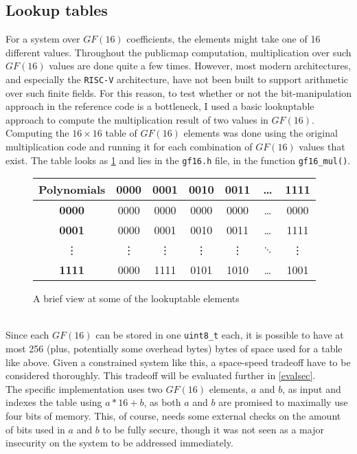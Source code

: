 \subsection{Lookup tables} \label{opt:lookup}
For a system over $GF(16)$ coefficients, the elements might take one of 16 different values. Throughout the publicmap computation, multiplication over such $GF(16)$ values are done quite a few times. However, most modern architectures, and especially the \texttt{RISC-V} architecture, have not been built to support arithmetic over such finite fields. For this reason, to test whether or not the bit-manipulation approach in the reference code is a bottleneck, I used a basic lookuptable approach to compute the multiplication result of two values in $GF(16)$.\medskip\\
Computing the $16 \times 16$ table of $GF(16)$ elements was done using the original multiplication code and running it for each combination of $GF(16)$ values that exist. 
The table looks as \cref{lookuptable} and lies in the \texttt{gf16.h} file, in the function \texttt{gf16\_mul()}.
\begin{figure}[t]
    \centering
    \begin{tabular}{|c|c|c|c|c|c|c|}
        \hline
            \textbf{Polynomials} & \textbf{0000} & \textbf{0001} & \textbf{0010} & \textbf{0011} & \dots & \textbf{1111} \\
        \hline
            \textbf{0000} & 0000 & 0000 & 0000 & 0000 & \dots & 0000\\
        \hline
            \textbf{0001} & 0000 & 0001 & 0010 & 0011 & \dots & 1111\\
        \hline
            \vdots & \vdots & \vdots & \vdots & \vdots & $\ddots$ & \vdots\\
        \hline
            \textbf{1111} & 0000 & 1111 & 0101 & 1010 & \dots & 1001\\
        \hline
    \end{tabular}
    \caption{A brief view at some of the lookuptable elements}
    \label{lookuptable}
\end{figure}\\
Since each $GF(16)$ can be stored in one \texttt{uint8\_t} each, it is possible to have at most 256 (plus, potentially some overhead bytes) bytes of space used for a table like above. Given a constrained system like this, a space-speed tradeoff have to be considered thoroughly. This tradeoff will be evaluated further in \cref{evalsec}.\medskip\\
The specific implementation uses two $GF(16)$ elements, $a$ and $b$, as input and indexes the table using $a*16 + b$, as both $a$ and $b$ are promised to maximally use four bits of memory. This, of course, needs some external checks on the amount of bits used in $a$ and $b$ to be fully secure, though it was not seen as a major insecurity on the system to be addressed immediately.\medskip\\
